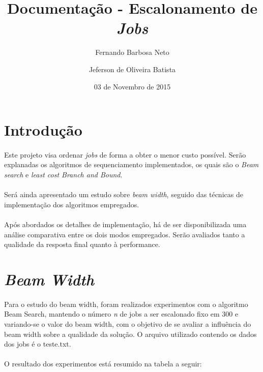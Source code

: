 \documentclass[12pt,a4paper]{article}
\title{Documentação - Escalonamento de {\it Jobs}}
\author{Fernando Barbosa Neto \and Jeferson de Oliveira Batista}
\date{03 de Novembro de 2015}
\begin{document}
 \maketitle
 \newpage
 
 \section{Introdução}
  {\paragraph{} Este projeto visa ordenar {\it jobs} de forma a obter o menor custo possível. Serão explanadas os algoritmos de sequenciamento implementados, os quais são o {\it Beam search} e {\it least cost Branch and Bound}. }
  {\paragraph{} Será ainda apresentado um estudo sobre {\it beam width}, seguido das técnicas de implementação dos algoritmos empregados. }
  {\paragraph{} Após abordados os detalhes de implementação, há de ser disponibilizada uma análise comparativa entre os dois modos empregados. Serão avaliados tanto a qualidade da resposta final quanto à performance. }
  
 \newpage
  
 \section{{\it Beam Width}}
  {\paragraph{} Para o estudo do beam width, foram realizados experimentos com o algoritmo Beam Search, mantendo o número \emph{n}
  de jobs a ser escalonado fixo em 300 e variando-se o valor do beam width, com o objetivo de se avaliar a influência do beam width
  sobre a qualidade da solução. O arquivo utilizado contendo os dados dos jobs é o teste.txt.}
  {\paragraph{} O resultado dos experimentos está resumido na tabela a seguir: }
  
\end{document}
